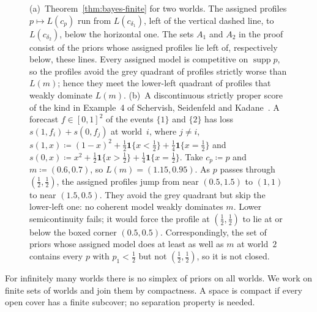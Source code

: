\documentclass[11pt]{article}
\theoremstyle{definition}
\theoremstyle{remark}
\newcommand{\one}{\mathbf 1}
\newcommand{\supp}{\operatorname{supp}}
\begin{document}
\begin{figure}[ht]
\caption{(a)~Theorem~\ref{thm:bayes-finite} for two worlds. The assigned profiles $p\mapsto L(c_p)$ run from $L(c_{\delta_1})$, left of the vertical dashed line, to $L(c_{\delta_2})$, below the horizontal one. The sets $A_1$ and $A_2$ in the proof consist of the priors whose assigned profiles lie left of, respectively below, these lines. Every assigned model is competitive on $\supp p$, so the profiles avoid the grey quadrant of profiles strictly worse than $L(m)$; hence they meet the lower-left quadrant of profiles that weakly dominate $L(m)$. (b)~A discontinuous strictly proper score of the kind in Example~4 of Schervish, Seidenfeld and Kadane~\cite{SSK09}. A forecast $f\in[0,1]^2$ of the events $\{1\}$ and $\{2\}$ has loss $s(1,f_i)+s(0,f_j)$ at world~$i$, where $j\ne i$, $s(1,x)\coloneqq(1-x)^2+\frac12\one\{x<\frac12\}+\frac14\one\{x=\frac12\}$ and $s(0,x)\coloneqq x^2+\frac12\one\{x>\frac12\}+\frac14\one\{x=\frac12\}$. Take $c_p\coloneqq p$ and $m\coloneqq(0.6,0.7)$, so $L(m)=(1.15,0.95)$. As $p$ passes through $(\frac12,\frac12)$, the assigned profiles jump from near $(0.5,1.5)$ to $(1,1)$ to near $(1.5,0.5)$. They avoid the grey quadrant but skip the lower-left one: no coherent model weakly dominates $m$. Lower semicontinuity fails; it would force the profile at $(\frac12,\frac12)$ to lie at or below the boxed corner $(0.5,0.5)$. Correspondingly, the set of priors whose assigned model does at least as well as $m$ at world~$2$ contains every $p$ with $p_1<\frac12$ but not $(\frac12,\frac12)$, so it is not closed.}
\label{fig:profiles}
\end{figure}

For infinitely many worlds there is no simplex of priors on all worlds. We work on finite sets of worlds and join them by compactness. A space is compact if every open cover has a finite subcover; no separation property is needed.
\end{document}
